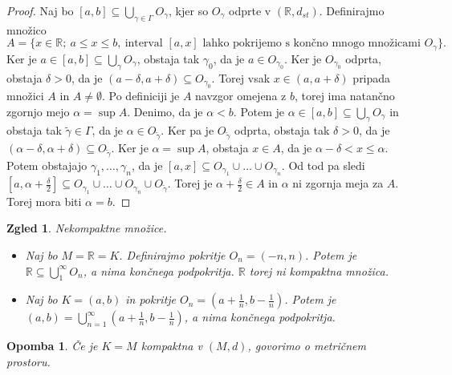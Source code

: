 \documentclass[10pt, a4paper]{article}
\newtheorem*{opomba}{Opomba}
\newtheorem{zgled}[izr]{Zgled}
\newenvironment{noticeC}{%
  \tcolorbox[%
  notitle,
  empty,
  enhanced,  %
  breakable,
  coltext=black, 
  fontupper=\rmfamily,
  noparskip,
  sharp corners,
  boxrule=-1pt,  %
  frame hidden,
  left=7pt,  %
  right=7pt,
  top=5pt,
  bottom=5pt,
  before skip=2.5ex plus 2pt,
  after skip=2.5ex plus 2pt,
  overlay unbroken and last={%
  },
  ]}
{\endtcolorbox}
\newenvironment{dokaz}%
  {\begin{noticeC}\begin{proof}}%
  {\end{proof}\end{noticeC}}
\newcommand{\R}{\mathbb {R}}
\begin{document}
\begin{dokaz}
    Naj bo $[a, b] \subseteq \bigcup_{\gamma \in \Gamma} O_\gamma$, kjer so $O_\gamma$ odprte v $(\R, d_{st})$.
    Definirajmo množico $$A = \{x \in \R;\ a \leq x \leq b,\ \text{interval $[a,x]$ lahko pokrijemo s končno mnogo množicami $O_\gamma$}\}.$$
    Ker je $a \in [a, b] \subseteq \bigcup_{\gamma} O_\gamma$, obstaja tak $\gamma_0$, da je $a \in O_{\gamma_0}$.
    Ker je $O_{\gamma_0}$ odprta, obstaja $\delta > 0$, da je $(a- \delta, a+ \delta) \subseteq O_{\gamma_0}$.
    Torej vsak $x \in (a, a+ \delta)$ pripada množici $A$ in $A \neq \emptyset$.
    Po definiciji je $A$ navzgor omejena z $b$, torej ima natančno zgornjo mejo $\alpha = \sup A$.
    Denimo, da je $\alpha < b.$ Potem je $\alpha \in [a, b] \subseteq \bigcup_{\gamma} O_\gamma$ in obstaja tak $\tilde{\gamma} \in \Gamma$,
    da je $\alpha \in O_{\tilde{\gamma}}$. Ker pa je $O_{\tilde{\gamma}}$ odprta, obstaja tak $\delta > 0$, da je $(\alpha - \delta, \alpha + \delta) \subseteq O_{\tilde{\gamma}}$.
    Ker je $\alpha = \sup A$, obstaja $x \in A$, da je $\alpha - \delta < x \leq \alpha.$
    Potem obstajajo $\gamma_1, \dots, \gamma_n$, da je $[a, x] \subseteq O_{\gamma_1} \cup \dots \cup O_{\gamma_n}$.
    Od tod pa sledi $[a, \alpha + \frac{\delta}{2}] \subseteq O_{\gamma_1} \cup \dots \cup O_{\gamma_n} \cup O_{\tilde{\gamma}}$.
    Torej je $\alpha + \frac{\delta}{2} \in A$ in $\alpha$ ni zgornja meja za $A$.
    Torej mora biti $\alpha = b.$
\end{dokaz}

\begin{zgled}
    Nekompaktne množice.
    \begin{itemize}
        \item Naj bo $M = \R = K$. Definirajmo pokritje $O_n = (-n, n)$.
        Potem je $\R \subseteq \bigcup_{1} ^\infty O_n$, a nima končnega podpokritja.
        $\R$ torej ni kompaktna množica.
        \item Naj bo $K = (a, b)$ in pokritje $O_n = \left(a+ \frac{1}{n}, b- \frac{1}{n}\right)$.
        Potem je $(a, b) = \bigcup_{n = 1} ^\infty \left(a + \frac{1}{n}, b - \frac{1}{n}\right)$, a nima končnega podpokritja.
    \end{itemize}
\end{zgled}

\begin{opomba}
    Če je $K = M$ kompaktna v $(M, d)$, govorimo o metričnem prostoru.
\end{opomba}
\end{document}
